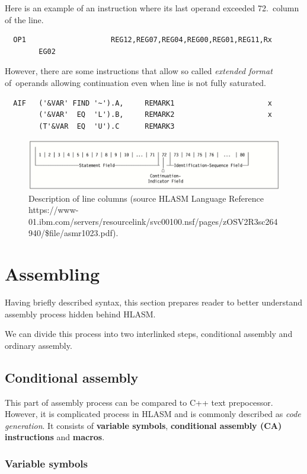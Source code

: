 Here is an example of an instruction where its last operand exceeded 72.~column of the line.
\begin{verbatim}
  OP1                    REG12,REG07,REG04,REG00,REG01,REG11,Rx
        EG02
\end{verbatim} 
However, there are some instructions that allow so called \textit{extended format} of~operands allowing continuation even when line is not fully saturated.
\begin{verbatim}
  AIF   ('&VAR' FIND '~').A,     REMARK1                      x
        ('&VAR'  EQ  'L').B,     REMARK2                      x
        (T'&VAR  EQ  'U').C      REMARK3 
\end{verbatim} 
\begin{figure}[h]\centering
	\includegraphics[scale=0.4]{img/line}
	\caption{Description of line columns (source HLASM Language Reference https://www-01.ibm.com/servers/resourcelink/\-svc00100.nsf/\-pages/\-zOSV2R3sc264940/\-\$file/\-asmr1023.pdf).}
	\label{fig01:line}
\end{figure}


\section{Assembling}

Having briefly described syntax, this section prepares reader to better understand assembly process hidden behind HLASM. 

We can divide this process into two interlinked steps, conditional assembly and ordinary assembly.

\subsection{Conditional assembly}

This part of assembly process can be compared to C++ text prepocessor. However, it is complicated process in HLASM and is commonly described as \textit{code generation}. It consists of \textbf{variable symbols}, \textbf{conditional assembly (CA) instructions} and \textbf{macros}. 


\subsubsection{Variable symbols}

